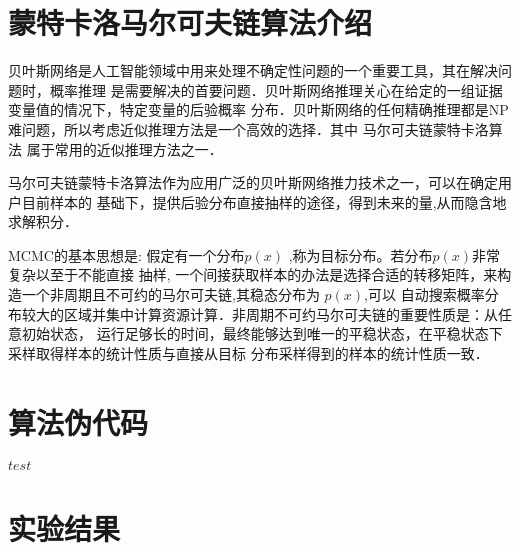 \section{蒙特卡洛马尔可夫链算法介绍}
    贝叶斯网络是人工智能领域中用来处理不确定性问题的一个重要工具，其在解决问题时，概率推理
是需要解决的首要问题．贝叶斯网络推理关心在给定的一组证据变量值的情况下，特定变量的后验概率
分布．贝叶斯网络的任何精确推理都是NP难问题，所以考虑近似推理方法是一个高效的选择．其中 马尔可夫链蒙特卡洛算法
属于常用的近似推理方法之一．

    马尔可夫链蒙特卡洛算法作为应用广泛的贝叶斯网络推力技术之一，可以在确定用户目前样本的
基础下，提供后验分布直接抽样的途径，得到未来的量,从而隐含地求解积分．
    
MCMC的基本思想是: 假定有一个分布$p(x)$ ,称为目标分布。若分布$p(x)$非常复杂以至于不能直接
抽样, 一个间接获取样本的办法是选择合适的转移矩阵，来构造一个非周期且不可约的马尔可夫链,其稳态分布为 $p(x)$,可以
自动搜索概率分布较大的区域并集中计算资源计算．非周期不可约马尔可夫链的重要性质是：从任意初始状态，
运行足够长的时间，最终能够达到唯一的平稳状态，在平稳状态下采样取得样本的统计性质与直接从目标
分布采样得到的样本的统计性质一致．


 

\section{算法伪代码}

\begin{algorithmic}
\State $test$
\end{algorithmic}
\section{实验结果}
